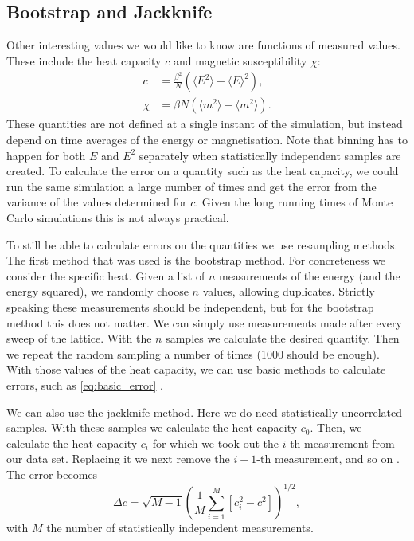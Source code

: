 \documentclass[11pt, a4paper]{report} %
\begin{document}
\subsection{Bootstrap and Jackknife}
Other interesting values we would like to know are functions of measured values.
These include the heat capacity \(c\) and magnetic susceptibility \(\chi\):
\begin{align}
	c &= \frac{\beta^2}{N} \left(\langle E^2 \rangle - \langle E \rangle^2 \right), \\
	\chi &= \beta N \left( \langle m^2 \rangle - \langle m^2 \rangle \right).
\end{align}
These quantities are not defined at a single instant of the simulation, but instead depend on time averages of the energy or magnetisation.
Note that binning has to happen for both \(E\) and \(E^2\) separately when statistically independent samples are created.
To calculate the error on a quantity such as the heat capacity, we could run the same simulation a large number of times and get the error from the variance of the values determined for \(c\).
Given the long running times of Monte Carlo simulations this is not always practical.

To still be able to calculate errors on the quantities we use resampling methods.
The first method that was used is the bootstrap method.
For concreteness we consider the specific heat.
Given a list of \(n\) measurements of the energy (and the energy squared), we randomly choose \(n\) values, allowing duplicates.
Strictly speaking these measurements should be independent, but for the bootstrap method this does not matter.
We can simply use measurements made after every sweep of the lattice.
With the \(n\) samples we calculate the desired quantity.
Then we repeat the random sampling a number of times (1000 should be enough).
With those values of the heat capacity, we can use basic methods to calculate errors, such as \cref{eq:basic_error} \cite{newman:1999}.

We can also use the jackknife method.
Here we do need statistically uncorrelated samples.
With these samples we calculate the heat capacity \(c_0\).
Then, we calculate the heat capacity \(c_i\) for which we took out the \(i\)-th measurement from our data set.
Replacing it we next remove the \(i+1\)-th measurement, and so on \cite{newman:1999}.
The error becomes \cite{corboz}
\begin{equation}
	\Delta c = \sqrt{M-1}\left( \frac{1}{M} \sum_{i=1}^M \left[c_i^2 - c^2\right] \right)^{1/2},
\end{equation}
with \(M\) the number of statistically independent measurements.
\end{document}

